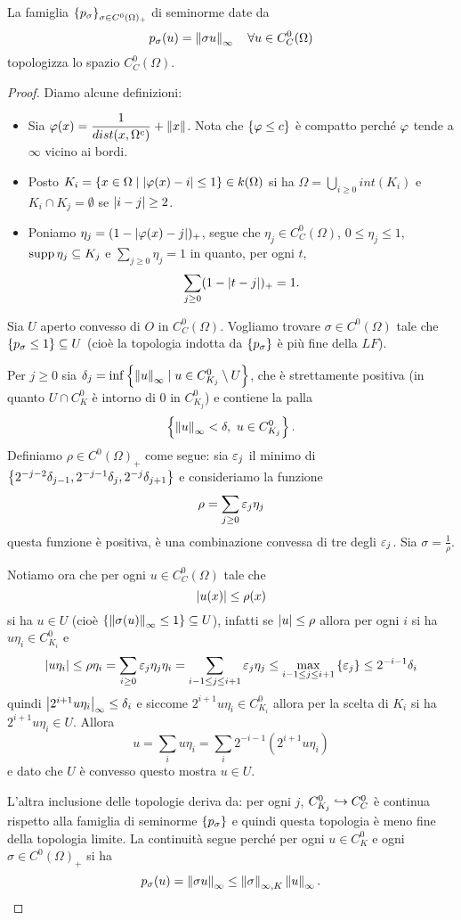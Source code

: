 \begin{proposition}\label{PrTopologizzazioneInNormeDiLimiteInduttivoContinueASupportoCompatto}
La famiglia $\left\{{p_\sigma}\right\}_{\sigma\in C^0(\Omega)_+}$ di seminorme date da
\[p_\sigma(u)=\left\Vert{\sigma u}\right\Vert_\infty\quad \forall u\in C_C^0(\Omega)\]
topologizza lo spazio $C_C^0(\Omega)$.
\end{proposition}
\begin{proof}
Diamo alcune definizioni:
\begin{itemize}
    \item Sia $\displaystyle \varphi(x)=\frac1{dist(x,\Omega^c)}+\left\Vert{x}\right\Vert$. Nota che $\left\{{\varphi\leq c}\right\}$ \`e compatto perch\'e $\varphi$ tende a $\infty$ vicino ai bordi.
    \item Posto $K_i=\left\{{x\in\Omega\mid \left|{\varphi(x)-i}\right|\leq 1}\right\}\in k(\Omega)$ si ha $\Omega=\bigcup_{i\geq 0}int(K_i)$ e $K_i\cap K_j=\emptyset$ se $\left|{i-j}\right|\geq 2$.
    \item Poniamo $\eta_j=(1-\left|{\varphi(x)-j}\right|)_+$, segue che $\eta_j\in C_C^0(\Omega)$, $0\leq \eta_j\leq 1$, $\operatorname{supp} \eta_j\subseteq K_j$ e $\sum_{j\geq 0}\eta_j=1$ in quanto, per ogni $t$,
    \[\sum_{j\geq 0}(1-\left|{t-j}\right|)_+=1.\]
\end{itemize}
Sia $U$ aperto convesso di $O$ in $C^0_C(\Omega)$. Vogliamo trovare $\sigma\in C^0(\Omega)$ tale che $\left\{{p_\sigma\leq 1}\right\}\subseteq U$ (cio\`e la topologia indotta da $\left\{{p_\sigma}\right\}$ \`e pi\`u fine della $LF$).

Per $j\geq 0$ sia $\delta_j=\inf\left\{{\left\Vert{u}\right\Vert_\infty\mid u\in C^0_{K_j}\setminus U}\right\}$, che \`e strettamente positiva (in quanto $U\cap C^0_K$ \`e intorno di $0$ in $C^0_{K_j}$) e contiene la palla
\[\left\{{\left\Vert{u}\right\Vert_\infty<\delta,\ u\in C^0_{K_j}}\right\}.\]
Definiamo $\rho\in C^0(\Omega)_+$ come segue:
sia $\varepsilon_j$ il minimo di $\left\{{2^{-j-2}\delta_{j-1},2^{-j-1}\delta_{j},2^{-j}\delta_{j+1}}\right\}$ e consideriamo la funzione
\[\rho=\sum_{j\geq0}\varepsilon_j\eta_j\]
questa funzione \`e positiva, \`e una combinazione convessa di tre degli $\varepsilon_j$. Sia $\sigma=\frac1\rho$.

Notiamo ora che per ogni $u\in C^0_C(\Omega)$ tale che
\[\left|{u(x)}\right|\leq \rho(x)\]
si ha $u\in U$ (cio\`e $\left\{{\left\Vert{\sigma(u)}\right\Vert_{\infty}\leq 1}\right\}\subseteq U$), infatti se $\left|{u}\right|\leq \rho$ allora per ogni $i$ si ha $u\eta_i\in C^0_{K_i}$ e
\[\left|{u\eta_i}\right|\leq \rho\eta_i=\sum_{i\geq 0}\varepsilon_j\eta_j\eta_i=\sum_{i-1\leq j\leq i+1}\varepsilon_j\eta_j\leq \max_{i-1\leq j\leq i+1}\left\{{\varepsilon_j}\right\}\leq 2^{-i-1}\delta_i\]
quindi $\left|{2^{i+1}u\eta_i}\right|_{\infty}\leq \delta_i$ e siccome $2^{i+1}u\eta_i\in C^0_{K_i}$ allora per la scelta di $K_i$ si ha $2^{i+1}u\eta_i\in U$. Allora
\[u=\sum_i u\eta_i=\sum_i 2^{-i-1} (2^{i+1}u\eta_i)\]
e dato che $U$ \`e convesso questo mostra $u\in U$.





L'altra inclusione delle topologie deriva da: per ogni $j$, $C^0_{K_j}\hookrightarrow C^0_C$ \`e continua rispetto alla famiglia di seminorme $\left\{{p_\sigma}\right\}$ e quindi questa topologia \`e meno fine della topologia limite. La continuit\`a segue perch\'e per ogni $u\in C^0_K$ e ogni $\sigma\in C^0(\Omega)_+$ si ha
\[p_\sigma(u)=\left\Vert{\sigma u}\right\Vert_\infty\leq \left\Vert{\sigma}\right\Vert_{\infty,K}\left\Vert{u}\right\Vert_\infty.\]
\end{proof}


